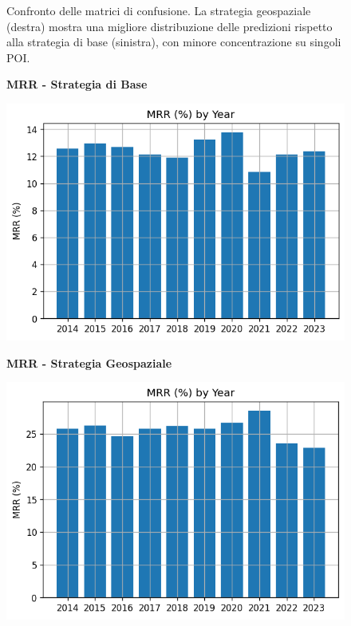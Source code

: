 \begin{itemize}
\begin{figure}[htbp]
\begin{minipage}{0.48\textwidth}
\end{minipage}
\caption{Confronto delle matrici di confusione. La strategia geospaziale (destra) mostra una migliore distribuzione delle predizioni rispetto alla strategia di base (sinistra), con minore concentrazione su singoli POI.}
\label{fig:confusion_comparison}
\end{figure}

\begin{figure}[htbp]
\centering
\begin{minipage}{0.48\textwidth}
\centering
\textbf{MRR - Strategia di Base}\par
\vspace{0.3em}
\includegraphics[width=\textwidth]{../../img/llama3.1_8b/no_SPACE-GEO_n-1_come_current_POI/mrr_distribution.png}
\end{minipage}
\hfill
\begin{minipage}{0.48\textwidth}
\centering
\textbf{MRR - Strategia Geospaziale}\par
\vspace{0.3em}
\includegraphics[width=\textwidth]{../../img/llama3.1_8b/SPACE-GEO_n-1_come_current_POI/MRR.png}

\end{minipage}
\end{figure}
\end{itemize}
